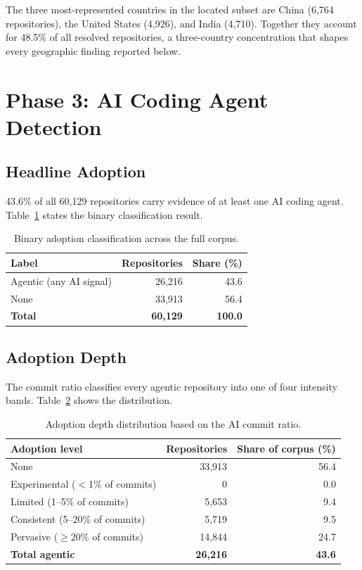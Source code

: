 The three most-represented countries in the located subset are China (6,764 repositories), the United States (4,926), and India (4,710). Together they account for 48.5\% of all resolved repositories, a three-country concentration that shapes every geographic finding reported below.

\section{Phase 3: AI Coding Agent Detection}
\label{sec:res:detection}

\subsection{Headline Adoption}

43.6\% of all 60,129 repositories carry evidence of at least one AI coding agent. Table~\ref{tab:headline} states the binary classification result.

\begin{table}[h]
\centering
\caption{Binary adoption classification across the full corpus.}
\label{tab:headline}
\begin{tabular}{@{}lrr@{}}
\toprule
Label & Repositories & Share (\%) \\
\midrule
Agentic (any AI signal) & 26,216 & 43.6 \\
None                    & 33,913 & 56.4 \\
\midrule
\textbf{Total} & \textbf{60,129} & \textbf{100.0} \\
\bottomrule
\end{tabular}
\end{table}

\subsection{Adoption Depth}

The commit ratio classifies every agentic repository into one of four intensity bands. Table~\ref{tab:depth} shows the distribution.

\begin{table}[h]
\centering
\caption{Adoption depth distribution based on the AI commit ratio.}
\label{tab:depth}
\begin{tabular}{@{}lrr@{}}
\toprule
Adoption level & Repositories & Share of corpus (\%) \\
\midrule
None                                   & 33,913 & 56.4 \\
Experimental ($<$1\% of commits)       &      0 &  0.0 \\
Limited (1--5\% of commits)            &  5,653 &  9.4 \\
Consistent (5--20\% of commits)        &  5,719 &  9.5 \\
Pervasive ($\geq$20\% of commits)      & 14,844 & 24.7 \\
\midrule
\textbf{Total agentic} & \textbf{26,216} & \textbf{43.6} \\
\bottomrule
\end{tabular}
\end{table}

